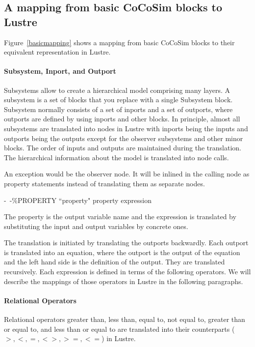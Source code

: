 \documentclass{article}
\begin{document}
\subsection{A mapping from basic CoCoSim blocks to Lustre}
Figure~\ref{basicmapping} shows a mapping from basic CoCoSim blocks to their equivalent representation in Lustre.

\paragraph{Subsystem, Inport, and Outport} 
Subsystems allow to create a hierarchical model comprising many layers. 
A subsystem is a set of blocks that you replace with a single \textsf{Subsystem} block. 
Subsystem normally consists of a set of inports and a set of outports, where outports are
defined by using inports and other blocks. 
In principle, almost all subsystems are translated into nodes in Lustre with inports being the 
inputs and outports being the outputs except for the observer subsystems and other minor blocks. 
The order of inputs and outputs are maintained during the translation. 
The hierarchical information about the model is translated into node calls.

An exception would be the observer node.
It will be inlined in the calling node as property statements instead of translating them 
as separate nodes.

\*

\indent \indent \indent \indent \textsf{-\ -\%PROPERTY ``property" property expression}

\*


\noindent The \textsf{property} is the output variable name and the expression is translated 
by substituting the input and output variables by concrete ones.

The translation is initiated by translating the outports backwardly. 
Each outport is translated into an equation, where the outport is the output of the equation 
and the left hand side is the definition of the output.
They are translated recursively.
Each expression is defined in terms of the following operators. 
We will describe the mappings of those operators in Lustre in the following paragraphs.

\paragraph{Relational Operators} 
Relational operators greater than, less than, equal to, not equal to, greater 
than or equal to, and less than or equal to are translated into their counterparts 
($>, <, =, <>, >=, <=$) in Lustre.
\end{document}
